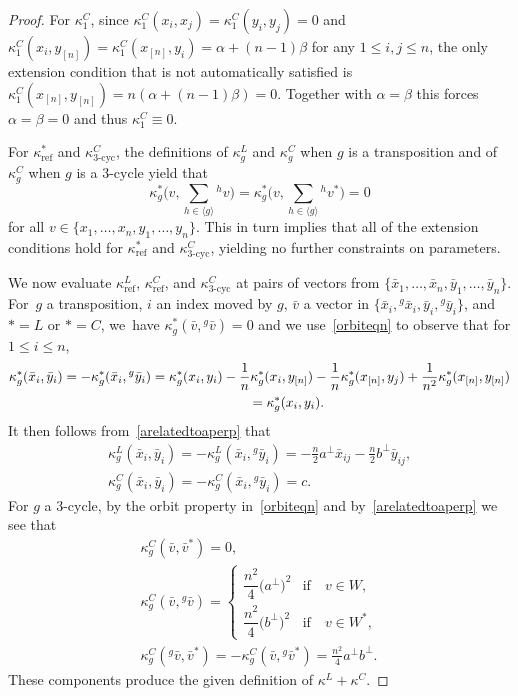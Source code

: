\documentclass[10pt,a4paper]{amsart}
\numberwithin{equation}{section}
\newcommand{\actby}[1]{{}^{#1}}
\newcommand{\actbylessspace}[1]{{}^{#1}\!}
\DeclareMathOperator{\refl}{ref}
\DeclareMathOperator{\tri}{3-cyc}
\begin{document}
\begin{proof}
For $\kappa^C_1$, since $\kappa^C_1(x_i,x_j)=\kappa^C_1(y_i,y_j)=0$ and
$\kappa^C_1(x_i,y_{[n]})=\kappa^C_1(x_{[n]},y_i)=\alpha+(n-1)\beta$ for
any $1 \leq i,j \leq n$, the only extension condition that is not
automatically satisfied is $\kappa^C_1(x_{[n]},y_{[n]})=n(\alpha+(n-1)\beta)=0$.
Together with $\alpha=\beta$ this forces $\alpha=\beta=0$ and thus $\kappa^C_1 \equiv 0$.

For $\kappa^*_{\refl}$ and $\kappa^C_{\tri}$, the definitions of $\kappa^L_g$
and $\kappa^C_g$ when $g$ is a transposition and of $\kappa^C_g$ when $g$
is a $3$-cycle yield that
\begin{equation}
\label{orbiteqn}
\kappa^*_g\bigg(v,\sum\limits_{h \in \langle g \rangle} \actby{h}v\bigg)=
\kappa^*_g\bigg(v,\sum\limits_{h \in \langle g \rangle} \actby{h}v^*\bigg)=0
\end{equation}
for all $v \in \{x_1,\dots,x_n,y_1,\dots,y_n\}$.
This in turn implies that all of the extension conditions hold
for $\kappa^*_{\refl}$ and $\kappa^C_{\tri}$, yielding no further constraints
on parameters.

We now evaluate $\kappa^L_{\refl}$, $\kappa^C_{\refl}$, and $\kappa^C_{\tri}$
at pairs of vectors
from $\{\bar{x}_1,\dots,\bar{x}_n,\bar{y}_1,\dots,\bar{y}_n\}$. For~$g$ a transposition, $i$ an index moved by $g$, $\bar{v}$
a vector in $\{\bar{x}_i,\actby{g}\bar{x}_i,\bar{y}_i,\actby{g}\bar{y}_i\}$,
and $*=L$ or $*=C$, we~have $\kappa^*_g(\bar{v},\actby{g}\bar{v})=0$
and we use~\eqref{orbiteqn} to observe that for $1 \leq i \leq n$,
\begin{gather*}
\kappa^*_g(\bar{x}_i,\bar{y}_i)=-\kappa^*_g(\bar{x}_i,\actby{g}\bar{y}_i)=
\kappa^*_g(x_i,y_i)-\frac{1}{n}\kappa^*_g(x_i,y_{[n]})
-\frac{1}{n}\kappa^*_g(x_{[n]},y_j)+\frac{1}{n^2}\kappa^*_g(x_{[n]},y_{[n]})
\\ \hphantom{\kappa^*_g(\bar{x}_i,\bar{y}_i)}
{}=\kappa^*_g(x_i,y_i).
\end{gather*}
It then follows from~\eqref{arelatedtoaperp} that
\begin{gather*}
\kappa^L_g(\bar{x}_i,\bar{y}_i)=-\kappa^L_g(\bar{x}_i,\actby{g}\bar{y}_i)
=-\frac{n}{2}a^\perp \bar{x}_{ij}-\frac{n}{2}b^\perp \bar{y}_{ij},
\\
\kappa^C_g(\bar{x}_i,\bar{y}_i)=-\kappa^C_g(\bar{x}_i,\actby{g}\bar{y}_i)=c.
\end{gather*}
For $g$ a $3$-cycle, by the orbit property in~\eqref{orbiteqn} and by~\eqref{arelatedtoaperp}
we see that
\begin{gather*}
\kappa^C_g(\bar{v},\bar{v}^*)=0, \\
\kappa^C_g(\bar{v},\actby{g}\bar{v})=
\begin{cases}
 	\dfrac{n^2}{4}\big(a^\perp\big)^2 & \text{if}\quad v \in W, \\[2ex]
 	\dfrac{n^2}{4}\big(b^\perp\big)^2 & \text{if}\quad v \in W^*,
\end{cases}
\\
\kappa^C_g(\actbylessspace{g}\bar{v},\bar{v}^*)=-\kappa^C_g(\bar{v},\actbylessspace{g}\bar{v}^*)=
\frac{n^2}{4}a^\perp b^\perp.
\end{gather*}
These components produce the given definition of $\kappa^L+\kappa^C$.
\end{proof}
\end{document}

